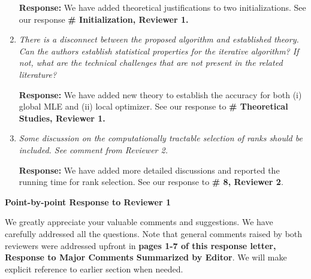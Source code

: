 \documentclass[11pt]{article}
\theoremstyle{plain}
\theoremstyle{definition}
\begin{document}
\begin{enumerate}[wide, labelwidth=!, labelindent=0pt]
         \textbf{Response:} We have added theoretical justifications to two initializations. See our response {\bf \# Initialization, Reviewer 1.} 
         
    \item \textit{There is a disconnect between the proposed algorithm and established theory. Can the authors establish statistical properties for the iterative algorithm? If not, what are the technical challenges that are not present in the related literature?}
    
     \textbf{Response:} We have added new theory to establish the accuracy for both (i) global MLE and (ii) local optimizer. See our response to {\bf \# Theoretical Studies, Reviewer 1.}
    
    \item \textit{Some discussion on the computationally tractable selection of ranks should be included. See comment from Reviewer 2.}
    
    \textbf{Response:} We have added more detailed discussions and reported the running time for rank selection. See our response to \textbf{\# 8, Reviewer 2}.
\end{enumerate}

\newpage

\begin{center}
    \textbf{Point-by-point Response to Reviewer 1}
\end{center}

We greatly appreciate your valuable comments and suggestions. We have carefully addressed all the questions. Note that general comments raised by both reviewers were addressed upfront in {\bf pages 1-7 of this response letter, Response to Major Comments Summarized by Editor}. We will make explicit reference to earlier section when needed. 

\vspace{0.2cm}
\end{document}

